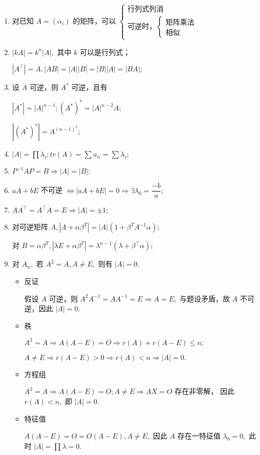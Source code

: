 \begin{enumerate}
    \item 对已知 $ A = (\alpha_i) $ 的矩阵，可以
    $ \begin{cases}
        \textrm{行列式列消}\\ \textrm{可逆时，}\begin{cases}
            \textrm{矩阵乘法}\\\textrm{相似}
        \end{cases}
    \end{cases} $ 
    \item $ |kA| = k^n|A|, $ 其中 $ k $ 可以是行列式；
    
    $ |A^\top|=A,|AB|=|A||B|=|B||A|=|BA|; $ 
    \item 设 $ A $ 可逆，则 $ A^* $ 可逆，且有

    $ |A^*| = |A|^{n-1};(A^*)^* = |A|^{n-2}A; $ 

    $ |(A^*)^*| = A^{(n-1)^2}; $ 
    \item $ |A| = \prod \lambda_i; tr(A) = \sum a_{ii} = \sum \lambda_i; $ 
    \item $ P^{-1}AP = B \Rightarrow |A| = |B|; $ 
    \item $ aA + bE $ 不可逆 $ \Leftrightarrow |aA + bE| = 0 \Rightarrow \exists \lambda_0 = \dfrac{-b}{a}; $ 
    \item $ AA^\top = A^\top A = E \Rightarrow |A| = \pm 1; $ 
    \item 对可逆矩阵 $ A, |A + \alpha\beta^T| = |A|(1+\beta^TA^{-1}\alpha); $ 
    
    对 $ B = \alpha\beta^T, |\lambda E + \alpha\beta^T| = \lambda^{n-1}(\lambda + \beta^\top\alpha); $ 
    \item 对 $ A_n, $ 若 $ A^2 = A,A\neq E, $ 则有 $ |A| = 0. $ \begin{itemize}
        \item 反证
        
        假设 $ A $ 可逆，则 $ A^2A^{-1} = AA^{-1} = E \Rightarrow A = E, $ 与题设矛盾，故
        $ A $ 不可逆，因此 $ |A| = 0. $ 
        \item 秩
        
        $ A^2 = A \Rightarrow A(A-E) = O \Rightarrow r(A) + r(A-E) \leq n;$
        
        $ A\neq E \Rightarrow r(A-E)>0 \Rightarrow r(A) < n \Rightarrow |A| = 0. $ 
        \item 方程组
        
        $ A^2 = A \Rightarrow A(A-E) = O; A \neq E \Rightarrow AX = O $ 存在非零解，
        因此 $ r(A)<n, $ 即 $ |A|=0. $ 
        \item 特征值
        
        $ A(A-E) = O = O(A-E),A\neq E, $ 因此 $ A $ 存在一特征值 $ \lambda_0 = 0, $ 
        此时 $ |A| = \prod \lambda = 0. $ 
    \end{itemize}
\end{enumerate}


